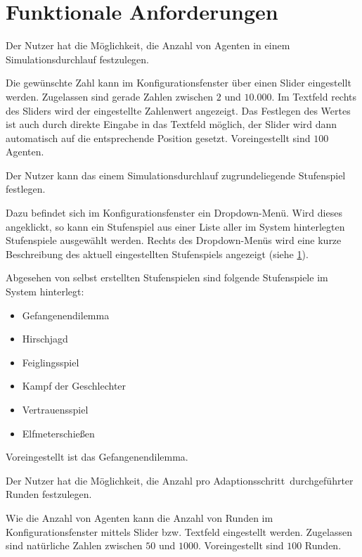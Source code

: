 \documentclass[parskip=full,11pt,twoside]{scrartcl}
\def\adapt{Adaptionsschritt}
\begin{document}
\section{Funktionale Anforderungen}

Der Nutzer hat die Möglichkeit, die Anzahl von Agenten in einem Simulationsdurchlauf festzulegen.

Die gewünschte Zahl kann im Konfigurationsfenster über einen Slider eingestellt werden. Zugelassen sind gerade Zahlen zwischen \(2\) und \(10.000\). Im Textfeld rechts des Sliders wird der eingestellte Zahlenwert angezeigt. Das Festlegen des Wertes ist auch durch direkte Eingabe in das Textfeld möglich, der Slider wird dann automatisch auf die entsprechende Position gesetzt. Voreingestellt sind \(100\) Agenten.

Der Nutzer kann das einem Simulationsdurchlauf zugrundeliegende Stufenspiel festlegen.

Dazu befindet sich im Konfigurationsfenster ein Dropdown-Menü. Wird dieses angeklickt, so kann ein Stufenspiel aus einer Liste aller im System hinterlegten Stufenspiele ausgewählt werden. Rechts des Dropdown-Menüs wird eine kurze Beschreibung des aktuell eingestellten Stufenspiels angezeigt (siehe \cref{}).

Abgesehen von selbst erstellten Stufenspielen sind folgende Stufenspiele im System hinterlegt:
\begin{itemize} \itemsep -10pt
\item Gefangenendilemma
\item Hirschjagd
\item Feiglingsspiel
\item Kampf der Geschlechter
\item Vertrauensspiel
\item Elfmeterschießen
\end{itemize}
Voreingestellt ist das Gefangenendilemma.

Der Nutzer hat die Möglichkeit, die Anzahl pro \adapt\ durchgeführter Runden festzulegen.

Wie die Anzahl von Agenten kann die Anzahl von Runden im Konfigurationsfenster mittels Slider bzw. Textfeld eingestellt werden. Zugelassen sind natürliche Zahlen zwischen \(50\) und \(1000\). Voreingestellt sind \(100\) Runden.
\end{document}
